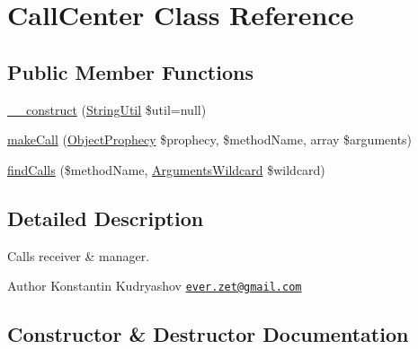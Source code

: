 \hypertarget{class_prophecy_1_1_call_1_1_call_center}{}\section{Call\+Center Class Reference}
\label{class_prophecy_1_1_call_1_1_call_center}
\subsection*{Public Member Functions}
\begin{DoxyCompactItemize}
\item 
\mbox{\hyperlink{class_prophecy_1_1_call_1_1_call_center_a957995a2f5cd98ebb4093190b136df61}{\+\_\+\+\_\+construct}} (\mbox{\hyperlink{class_prophecy_1_1_util_1_1_string_util}{String\+Util}} \$util=null)
\item 
\mbox{\hyperlink{class_prophecy_1_1_call_1_1_call_center_add3225f106c8f774179cbe8e2aa52af5}{make\+Call}} (\mbox{\hyperlink{class_prophecy_1_1_prophecy_1_1_object_prophecy}{Object\+Prophecy}} \$prophecy, \$method\+Name, array \$arguments)
\item 
\mbox{\hyperlink{class_prophecy_1_1_call_1_1_call_center_ac5d5cb4ed2e38251ff232f3e5eb8cdfb}{find\+Calls}} (\$method\+Name, \mbox{\hyperlink{class_prophecy_1_1_argument_1_1_arguments_wildcard}{Arguments\+Wildcard}} \$wildcard)
\end{DoxyCompactItemize}


\subsection{Detailed Description}
Calls receiver \& manager.

\begin{DoxyAuthor}{Author}
Konstantin Kudryashov \href{mailto:ever.zet@gmail.com}{\tt ever.\+zet@gmail.\+com} 
\end{DoxyAuthor}


\subsection{Constructor \& Destructor Documentation}
\mbox{\label{class_prophecy_1_1_call_1_1_call_center_a957995a2f5cd98ebb4093190b136df61}} 
